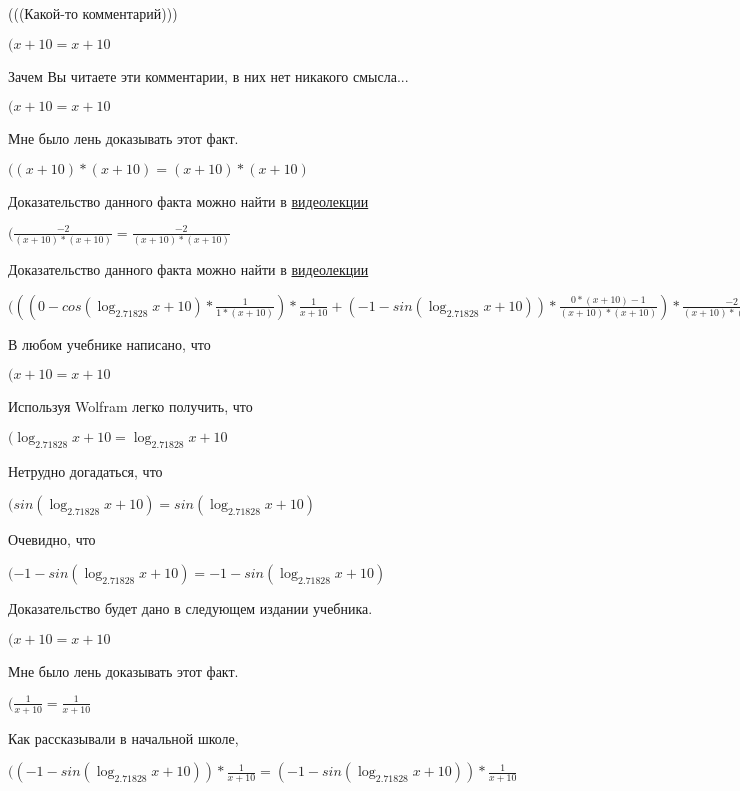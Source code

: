 \documentclass[12pt,a4paper,fleqn]{article}
\theoremstyle{definition}
\begin{document}
(((Какой-то комментарий)))

$( x  +  10  =  x  +  10 $

Зачем Вы читаете эти комментарии, в них нет никакого смысла...

$( x  +  10  =  x  +  10 $

Мне было лень доказывать этот факт.

$(( x  +  10 ) * ( x  +  10 ) = ( x  +  10 ) * ( x  +  10 )$

Доказательство данного факта можно найти в \href{https://www.youtube.com/watch?v=dQw4w9WgXcQ}{видеолекции}

$(\frac{ -2 }{( x  +  10 ) * ( x  +  10 )}
 = \frac{ -2 }{( x  +  10 ) * ( x  +  10 )}
$

Доказательство данного факта можно найти в \href{https://www.youtube.com/watch?v=dQw4w9WgXcQ}{видеолекции}

$((( 0  - cos(\log_{ 2.71828 }{ x  +  10 }) * \frac{ 1 }{ 1  * ( x  +  10 )}
) * \frac{ 1 }{ x  +  10 }
 + ( -1  - sin(\log_{ 2.71828 }{ x  +  10 })) * \frac{ 0  * ( x  +  10 ) -  1 }{( x  +  10 ) * ( x  +  10 )}
) * \frac{ -2 }{( x  +  10 ) * ( x  +  10 )}
 = (( 0  - cos(\log_{ 2.71828 }{ x  +  10 }) * \frac{ 1 }{ 1  * ( x  +  10 )}
) * \frac{ 1 }{ x  +  10 }
 + ( -1  - sin(\log_{ 2.71828 }{ x  +  10 })) * \frac{ 0  * ( x  +  10 ) -  1 }{( x  +  10 ) * ( x  +  10 )}
) * \frac{ -2 }{( x  +  10 ) * ( x  +  10 )}
$

В любом учебнике написано, что

$( x  +  10  =  x  +  10 $

Используя Wolfram легко получить, что

$(\log_{ 2.71828 }{ x  +  10 } = \log_{ 2.71828 }{ x  +  10 }$

Нетрудно догадаться, что

$(sin(\log_{ 2.71828 }{ x  +  10 }) = sin(\log_{ 2.71828 }{ x  +  10 })$

Очевидно, что

$( -1  - sin(\log_{ 2.71828 }{ x  +  10 }) =  -1  - sin(\log_{ 2.71828 }{ x  +  10 })$

Доказательство будет дано в следующем издании учебника.

$( x  +  10  =  x  +  10 $

Мне было лень доказывать этот факт.

$(\frac{ 1 }{ x  +  10 }
 = \frac{ 1 }{ x  +  10 }
$

Как рассказывали в начальной школе,

$(( -1  - sin(\log_{ 2.71828 }{ x  +  10 })) * \frac{ 1 }{ x  +  10 }
 = ( -1  - sin(\log_{ 2.71828 }{ x  +  10 })) * \frac{ 1 }{ x  +  10 }
$
\end{document}

